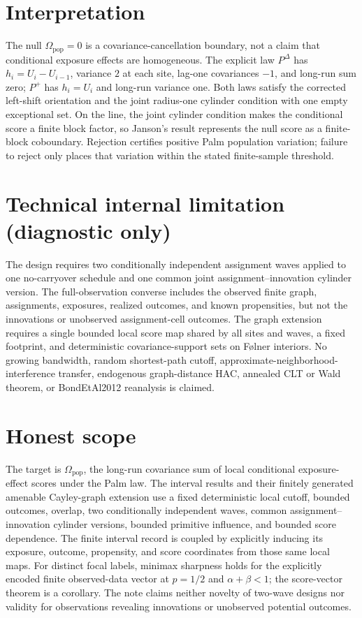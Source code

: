 \documentclass{article}
\begin{document}
\section{Interpretation}

The null \(\Omega_{\mathrm{pop}}=0\) is a covariance-cancellation boundary, not a claim that conditional exposure effects are homogeneous. The explicit law \(P^{\Delta}\) has \(h_i=U_i-U_{i-1}\), variance \(2\) at each site, lag-one covariances \(-1\), and long-run sum zero; \(P^+\) has \(h_i=U_i\) and long-run variance one. Both laws satisfy the corrected left-shift orientation and the joint radius-one cylinder condition with one empty exceptional set. On the line, the joint cylinder condition makes the conditional score a finite block factor, so Janson's result represents the null score as a finite-block coboundary. Rejection certifies positive Palm population variation; failure to reject only places that variation within the stated finite-sample threshold.

\section*{Technical internal limitation (diagnostic only)}

The design requires two conditionally independent assignment waves applied to one no-carryover schedule and one common joint assignment--innovation cylinder version. The full-observation converse includes the observed finite graph, assignments, exposures, realized outcomes, and known propensities, but not the innovations or unobserved assignment-cell outcomes. The graph extension requires a single bounded local score map shared by all sites and waves, a fixed footprint, and deterministic covariance-support sets on F\o lner interiors. No growing bandwidth, random shortest-path cutoff, approximate-neighborhood-interference transfer, endogenous graph-distance HAC, annealed CLT or Wald theorem, or BondEtAl2012 reanalysis is claimed.

\section{Honest scope}

The target is \(\Omega_{\mathrm{pop}}\), the long-run covariance sum of local conditional exposure-effect scores under the Palm law. The interval results and their finitely generated amenable Cayley-graph extension use a fixed deterministic local cutoff, bounded outcomes, overlap, two conditionally independent waves, common assignment--innovation cylinder versions, bounded primitive influence, and bounded score dependence. The finite interval record is coupled by explicitly inducing its exposure, outcome, propensity, and score coordinates from those same local maps. For distinct focal labels, minimax sharpness holds for the explicitly encoded finite observed-data vector at \(p=1/2\) and \(\alpha+\beta<1\); the score-vector theorem is a corollary. The note claims neither novelty of two-wave designs nor validity for observations revealing innovations or unobserved potential outcomes.
\end{document}
